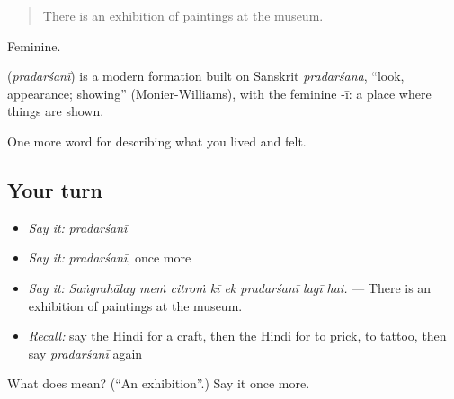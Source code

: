 \begin{quote}
There is an exhibition of paintings at the museum.
\end{quote}

Feminine.

\begin{cousinweb}
\textbf{} (\emph{pradarśanī}) is a modern formation built on Sanskrit \emph{pradarśana}, \textquotedblleft{}look, appearance; showing\textquotedblright{} (Monier-Williams), with the feminine -ī: a place where things are shown.
\end{cousinweb}

\begin{grammarlens}[title={What you've built}]
One more word for describing what you lived and felt.
\end{grammarlens}

\subsection*{Your turn}
\begin{itemize}
\raggedright
  \item \emph{Say it:} \emph{pradarśanī}
  \item \emph{Say it:} \emph{pradarśanī}, once more
  \item \emph{Say it:} \emph{Saṅgrahālay meṁ citroṁ kī ek pradarśanī lagī hai.} — There is an exhibition of paintings at the museum.
  \item \emph{Recall:} say the Hindi for a craft, then the Hindi for to prick, to tattoo, then say \emph{pradarśanī} again
\end{itemize}

\begin{tcolorbox}[breakable,colback=teal!4,colframe=teal!35!black,title={Before you move on}]
What does  mean? (\textquotedblleft{}An exhibition\textquotedblright{}.) Say it once more.
\end{tcolorbox}
